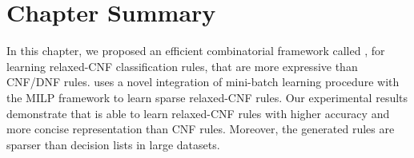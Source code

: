 \section{Chapter Summary}
\label{interpretability_crr_sec:conclusion}

In this chapter, we proposed an efficient combinatorial framework called {\crr}, for learning relaxed-CNF  classification rules, that are  more expressive  than CNF/DNF rules.  {\crr}  uses a novel integration of mini-batch learning procedure with the MILP framework to learn sparse relaxed-CNF rules. Our experimental results demonstrate that {\crr} is able to learn relaxed-CNF  rules with higher accuracy and more concise representation than CNF rules. Moreover, the generated rules are sparser than decision lists in large datasets. 